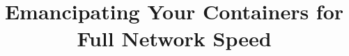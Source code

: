 \documentclass{cls/hotnets16}
\def\harry#1{{\textcolor{purple}{harry: {\sf #1}}}}
\newcommand{\vyas}[1]{{\footnotesize\color{red}[VS: #1]}}
\begin{document}
\title{Emancipating Your Containers for Full Network Speed}


\date{}


\maketitle
\thispagestyle{empty}









%
%
\end{document}

